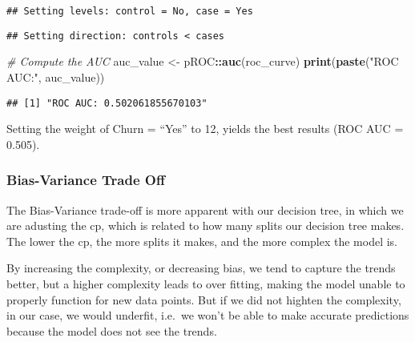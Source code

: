 \documentclass[
]{article}
\newenvironment{Shaded}{\begin{snugshade}}{\end{snugshade}}
\newcommand{\AttributeTok}[1]{\textcolor[rgb]{0.13,0.29,0.53}{#1}}
\newcommand{\CommentTok}[1]{\textcolor[rgb]{0.56,0.35,0.01}{\textit{#1}}}
\newcommand{\FunctionTok}[1]{\textcolor[rgb]{0.13,0.29,0.53}{\textbf{#1}}}
\newcommand{\NormalTok}[1]{#1}
\newcommand{\OtherTok}[1]{\textcolor[rgb]{0.56,0.35,0.01}{#1}}
\newcommand{\SpecialCharTok}[1]{\textcolor[rgb]{0.81,0.36,0.00}{\textbf{#1}}}
\newcommand{\StringTok}[1]{\textcolor[rgb]{0.31,0.60,0.02}{#1}}
\begin{document}
\begin{Shaded}
\end{Shaded}

\begin{verbatim}
## Setting levels: control = No, case = Yes
\end{verbatim}

\begin{verbatim}
## Setting direction: controls < cases
\end{verbatim}

\begin{Shaded}
\begin{Highlighting}[]
\CommentTok{\# Compute the AUC}
\NormalTok{auc\_value }\OtherTok{\textless{}{-}}\NormalTok{ pROC}\SpecialCharTok{::}\FunctionTok{auc}\NormalTok{(roc\_curve)}
\FunctionTok{print}\NormalTok{(}\FunctionTok{paste}\NormalTok{(}\StringTok{"ROC AUC:"}\NormalTok{, auc\_value))}
\end{Highlighting}
\end{Shaded}

\begin{verbatim}
## [1] "ROC AUC: 0.502061855670103"
\end{verbatim}

Setting the weight of Churn = ``Yes'' to 12, yields the best results
(ROC AUC = 0.505).

\subsubsection{Bias-Variance Trade Off}\label{bias-variance-trade-off}

The Bias-Variance trade-off is more apparent with our decision tree, in
which we are adusting the cp, which is related to how many splits our
decision tree makes. The lower the cp, the more splits it makes, and the
more complex the model is.

By increasing the complexity, or decreasing bias, we tend to capture the
trends better, but a higher complexity leads to over fitting, making the
model unable to properly function for new data points. But if we did not
highten the complexity, in our case, we would underfit, i.e.~we won't be
able to make accurate predictions because the model does not see the
trends.
\end{document}
